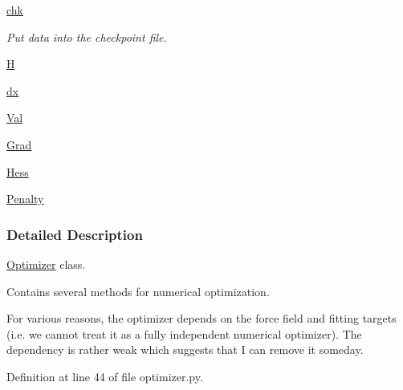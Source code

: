 \begin{DoxyCompactItemize}
\hyperlink{classforcebalance_1_1optimizer_1_1Optimizer_aab04585adf73123d3187aa7dd22e7ce2}{chk}
\begin{DoxyCompactList}\small\item\em Put data into the checkpoint file. \end{DoxyCompactList}\item 
\hyperlink{classforcebalance_1_1optimizer_1_1Optimizer_a7cf404b3b15afec4237344f09a31b6c7}{H}
\item 
\hyperlink{classforcebalance_1_1optimizer_1_1Optimizer_aaa9b39385a4d067aec12a595da09cc16}{dx}
\item 
\hyperlink{classforcebalance_1_1optimizer_1_1Optimizer_a2577b97a9ee5f3fcd4aa108a2baafc04}{Val}
\item 
\hyperlink{classforcebalance_1_1optimizer_1_1Optimizer_a91fbca8385133fa434eae3078e217fb6}{Grad}
\item 
\hyperlink{classforcebalance_1_1optimizer_1_1Optimizer_ab99276420d1c28932d2559c7f8e88922}{Hess}
\item 
\hyperlink{classforcebalance_1_1optimizer_1_1Optimizer_a5dc01aec7e22062a42cc83298c49cadd}{Penalty}
\end{DoxyCompactItemize}


\subsubsection{Detailed Description}
\hyperlink{classforcebalance_1_1optimizer_1_1Optimizer}{Optimizer} class. 

Contains several methods for numerical optimization.

For various reasons, the optimizer depends on the force field and fitting targets (i.\-e. we cannot treat it as a fully independent numerical optimizer). The dependency is rather weak which suggests that I can remove it someday. 

Definition at line 44 of file optimizer.\-py.



